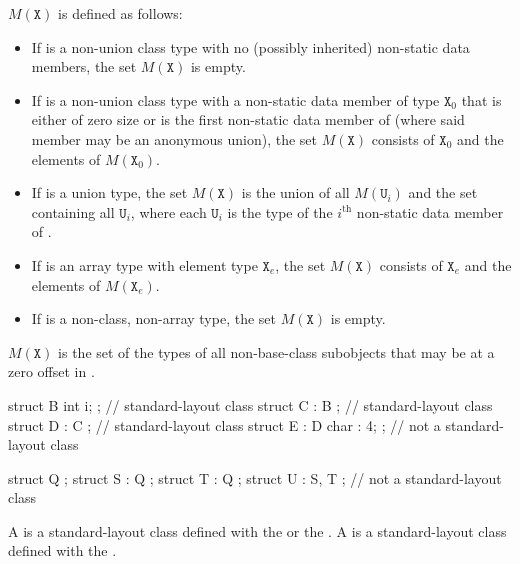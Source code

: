 $M(\mathtt{X})$ is defined as follows:
\begin{itemize}
\item If  is a non-union class type with no (possibly
inherited) non-static data members, the set
$M(\mathtt{X})$ is empty.

\item If  is a non-union class type with a non-static data
member of type $\mathtt{X}_0$
that is either of zero size or
is the first non-static data member of 
(where said member may be an anonymous union),
the set $M(\mathtt{X})$ consists of $\mathtt{X}_0$ and the elements of
$M(\mathtt{X}_0)$.

\item If  is a union type, the set $M(\mathtt{X})$ is
the union of all $M(\mathtt{U}_i)$ and the set containing all $\mathtt{U}_i$,
where each $\mathtt{U}_i$ is the type of the $i^\text{th}$ non-static data member
of .

\item If  is an array type with element type $\mathtt{X}_e$,
the set $M(\mathtt{X})$ consists of $\mathtt{X}_e$
and the elements of $M(\mathtt{X}_e)$.

\item If  is a non-class, non-array type, the set $M(\mathtt{X})$ is empty.
\end{itemize}

\begin{note} $M(\mathtt{X})$ is the set of the types of all non-base-class subobjects
that may be at a zero offset in . \end{note}

\begin{example}
\begin{codeblock}
   struct B { int i; };         // standard-layout class
   struct C : B { };            // standard-layout class
   struct D : C { };            // standard-layout class
   struct E : D { char : 4; };  // not a standard-layout class

   struct Q {};
   struct S : Q { };
   struct T : Q { };
   struct U : S, T { };         // not a standard-layout class
\end{codeblock}
\end{example}

\pnum
A  is a standard-layout class
defined with the   or the
 .
A  is a standard-layout class
defined with the
 .

